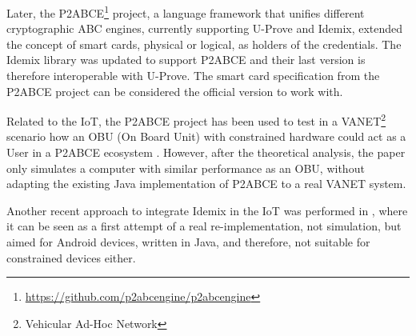 
Later, the P2ABCE\footnote{\url{https://github.com/p2abcengine/p2abcengine}} project, a language framework that unifies different cryptographic ABC engines, currently supporting U-Prove and Idemix, extended the concept of smart cards, physical or logical, as holders of the credentials. The Idemix library was updated to support P2ABCE and their last version is therefore interoperable with U-Prove. The smart card specification from the P2ABCE project can be considered the official version to work with.


Related to the IoT, the P2ABCE project has been used to test in a VANET\footnote{Vehicular Ad-Hoc Network} scenario how an OBU (On Board Unit) with constrained hardware could act as a User in a P2ABCE ecosystem \cite{vanet}. However, after the theoretical analysis, the paper only simulates a computer with similar performance as an OBU, without adapting the existing Java implementation of P2ABCE to a real VANET system. 

Another recent approach to integrate Idemix in the IoT was performed in \cite{DBLP:journals/mis/BernabeRG17}, where it can be seen as a first attempt of a real re-implementation, not simulation, but aimed for Android devices, written in Java, and therefore, not suitable for constrained devices either.



